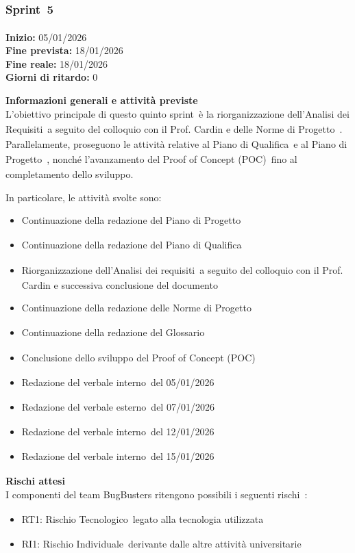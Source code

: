 \documentclass[a4paper,12pt]{article}
\newcommand{\pediceG}{\texorpdfstring{\textsubscript{\scalebox{0.6}{\textbf{G}}}~}{G}}
\begin{document}
\newpage

\subsubsection{Sprint\pediceG 5}

\textbf{Inizio:} 05/01/2026 \\
\textbf{Fine prevista:} 18/01/2026 \\
\textbf{Fine reale:} 18/01/2026 \\
\textbf{Giorni di ritardo:} 0

\noindent\textbf{Informazioni generali e attività previste}\\
L'obiettivo principale di questo quinto sprint\pediceG è la riorganizzazione dell'Analisi dei Requisiti\pediceG a seguito del colloquio con il Prof. Cardin e delle Norme di Progetto\pediceG. Parallelamente, proseguono le attività relative al Piano di Qualifica\pediceG e al Piano di Progetto\pediceG, nonché l'avanzamento del Proof of Concept (POC)\pediceG fino al completamento dello sviluppo.

In particolare, le attività svolte sono:
\begin{itemize}
    \item Continuazione della redazione del Piano di Progetto\pediceG
    \item Continuazione della redazione del Piano di Qualifica\pediceG
    \item Riorganizzazione dell'Analisi dei requisiti\pediceG a seguito del colloquio con il Prof. Cardin e successiva conclusione del documento
    \item Continuazione della redazione delle Norme di Progetto\pediceG
    \item Continuazione della redazione del Glossario\pediceG
    \item Conclusione dello sviluppo del Proof of Concept (POC)\pediceG
    \item Redazione del verbale interno\pediceG del 05/01/2026
    \item Redazione del verbale esterno\pediceG del 07/01/2026
    \item Redazione del verbale interno\pediceG del 12/01/2026
    \item Redazione del verbale interno\pediceG del 15/01/2026
\end{itemize}

\noindent\textbf{Rischi attesi}\\
I componenti del team BugBusters ritengono possibili i seguenti rischi\pediceG:
\begin{itemize}
    \item RT1: Rischio Tecnologico\pediceG legato alla tecnologia utilizzata
    \item RI1: Rischio Individuale\pediceG derivante dalle altre attività universitarie
\end{itemize}
\end{document}
